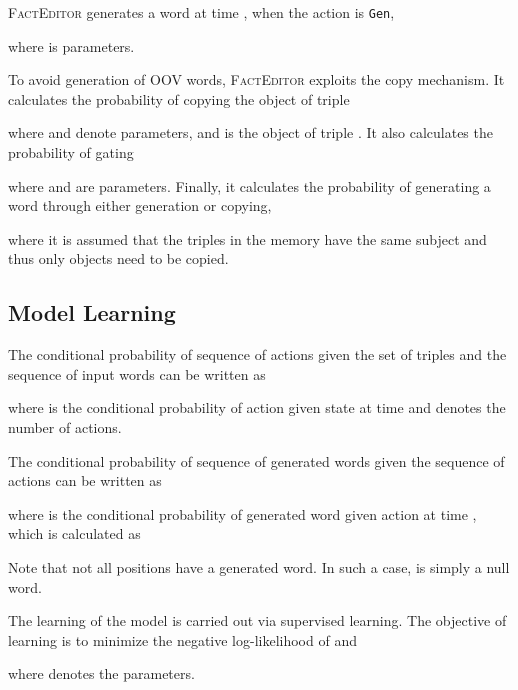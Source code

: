 \documentclass[11pt,a4paper]{article}
\begin{document}
\textsc{FactEditor} generates a word  at time , when the action is \texttt{Gen},

where  is parameters.

To avoid generation of OOV words, \textsc{FactEditor} exploits the copy mechanism. It calculates the probability of copying the object of triple 

where  and  denote parameters, and  is the object of triple . It also calculates the probability of gating

where  and  are parameters. Finally, it calculates the probability of generating a word  through either generation or copying,

where it is assumed that the triples in the memory have the same subject and thus only objects need to be copied.

\subsection{Model Learning}

The conditional probability of sequence of actions  given the set of triples  and the sequence of input words  can be written as

where  is the conditional probability of action  given state  at time  and  denotes the number of actions.

The conditional probability of sequence of generated words  given the sequence of actions  can be written as

where  is the conditional probability of generated word  given action  at time , which
is calculated as

Note that not all positions have a generated word. In such a case,  is simply a null word.

The learning of the model is carried out via supervised learning. 
The objective of learning is to minimize the negative log-likelihood of  and 

where  denotes the parameters.
\end{document}

